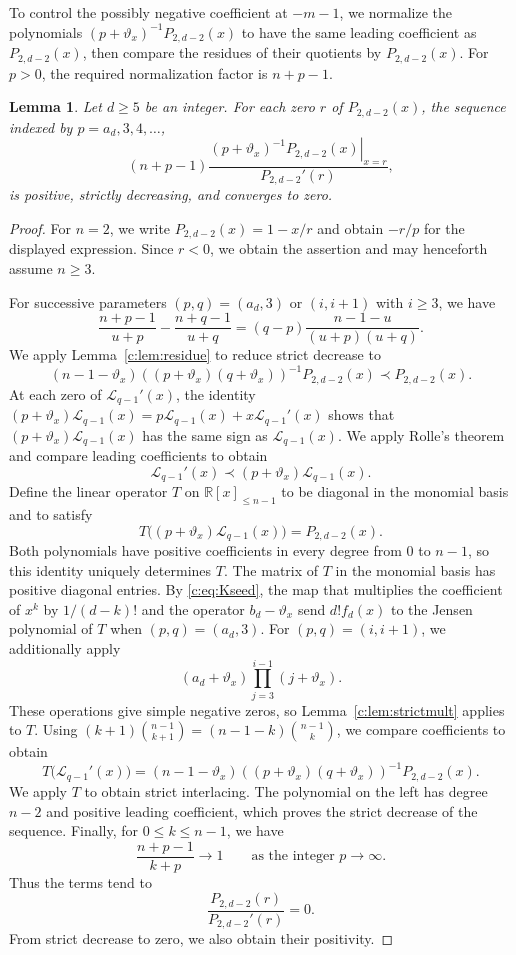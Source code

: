 \documentclass[10pt,a4paper]{article}
\numberwithin{equation}{section}
\newtheorem{lemma}[theorem]{Lemma}
\theoremstyle{remark}\newtheorem{remark}[theorem]{Remark}
\newcommand{\varthetax}{\vartheta_x}
\begin{document}
To control the possibly negative coefficient at $-m-1$, we normalize
the polynomials $(p+\varthetax)^{-1}P_{2,d-2}(x)$ to have the same
leading coefficient as $P_{2,d-2}(x)$, then compare the residues of their
quotients by $P_{2,d-2}(x)$. For $p>0$, the required normalization factor
is $n+p-1$.

\begin{lemma}\label{c:lem:left}
Let $d\ge5$ be an integer. For each zero $r$ of $P_{2,d-2}(x)$, the sequence indexed by $p=a_d,3,4,\ldots$,
\[
 (n+p-1)\frac{\left.(p+\varthetax)^{-1}P_{2,d-2}(x)\right|_{x=r}}{P_{2,d-2}'(r)},
\]
is positive, strictly decreasing, and converges to zero.
\end{lemma}
\begin{proof}
For $n=2$, we write $P_{2,d-2}(x)=1-x/r$ and obtain $-r/p$ for
the displayed expression. Since $r<0$, we obtain the assertion
and may henceforth assume $n\ge3$.

For successive parameters $(p,q)=(a_d,3)$ or $(i,i+1)$ with $i\ge3$, we have
\[
 \frac{n+p-1}{u+p}-\frac{n+q-1}{u+q}
 =(q-p)\frac{n-1-u}{(u+p)(u+q)}.
\]
We apply Lemma~\ref{c:lem:residue} to reduce strict decrease to
\[
 (n-1-\varthetax)((p+\varthetax)(q+\varthetax))^{-1}P_{2,d-2}(x)
 \prec P_{2,d-2}(x).
\]
At each zero of $\mathscr L_{q-1}'(x)$, the identity
$(p+\varthetax)\mathscr L_{q-1}(x)=p\mathscr L_{q-1}(x)+x\mathscr L_{q-1}'(x)$
shows that $(p+\varthetax)\mathscr L_{q-1}(x)$ has the same sign as
$\mathscr L_{q-1}(x)$. We apply Rolle's theorem and compare leading coefficients
to obtain
\[
 \mathscr L_{q-1}'(x)\prec(p+\varthetax)\mathscr L_{q-1}(x).
\]
Define the linear operator $T$ on $\mathbb R[x]_{\le n-1}$ to be
diagonal in the monomial basis and to satisfy
\[
 T\bigl((p+\varthetax)\mathscr L_{q-1}(x)\bigr)=P_{2,d-2}(x).
\]
Both polynomials have positive coefficients in every degree from $0$
to $n-1$, so this identity uniquely determines $T$. The matrix of $T$
in the monomial basis has positive diagonal entries.
By \eqref{c:eq:Kseed}, the map that multiplies the coefficient of $x^k$
by $1/(d-k)!$ and the operator $b_d-\varthetax$ send $d!f_d(x)$
to the Jensen polynomial of $T$
when $(p,q)=(a_d,3)$. For $(p,q)=(i,i+1)$, we additionally apply
\[
 (a_d+\varthetax)\prod_{j=3}^{i-1}(j+\varthetax).
\]
These operations give simple negative zeros, so
Lemma~\ref{c:lem:strictmult} applies to $T$.
Using $(k+1)\binom{n-1}{k+1}=(n-1-k)\binom{n-1}{k}$,
we compare coefficients to obtain
\[
 T\bigl(\mathscr L_{q-1}'(x)\bigr)
 =(n-1-\varthetax)((p+\varthetax)(q+\varthetax))^{-1}P_{2,d-2}(x).
\]
We apply $T$ to obtain strict interlacing. The polynomial on the left has
degree $n-2$ and positive leading coefficient, which proves the
strict decrease of the sequence.
Finally, for $0\le k\le n-1$, we have
\[
 \frac{n+p-1}{k+p}\to1
 \qquad\text{as the integer }p\to\infty.
\]
Thus the terms tend to
\[
 \frac{P_{2,d-2}(r)}{P_{2,d-2}'(r)}=0.
\]
From strict decrease to zero, we also obtain their positivity.
\end{proof}
\end{document}
